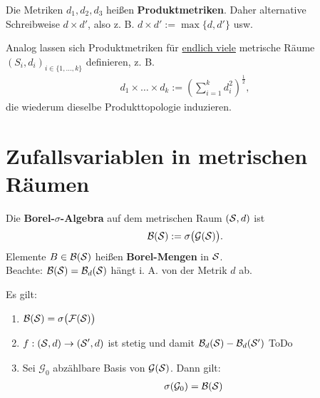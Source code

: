 \begin{defi}
Die Metriken $d_1,d_2,d_3$ heißen \textbf{Produktmetriken}. Daher alternative\\ Schreibweise $d\times d'$, also z. B. $d\times d':=\max\lbrace d,d'\rbrace$ usw.
\end{defi}

\begin{bemerkungnr} %
Analog lassen sich Produktmetriken für \underline{endlich viele} metrische Räume $(S_i,d_i)_{i\in\lbrace1,\ldots,k\rbrace}$ definieren, z. B.
\begin{align*}
d_1\times\ldots\times d_k:=\left(\sum\limits_{i=1}^k d_i^2\right)^{\frac{1}{2}},
\end{align*}
die wiederum dieselbe Produkttopologie induzieren.
\end{bemerkungnr}

\section{Zufallsvariablen in metrischen Räumen}
\begin{definition} %
Die \textbf{Borel-$\sigma$-Algebra} auf dem metrischen Raum $(\S,d)$ ist %
\begin{align*}
\B(\S):=\sigma\big(\mathcal{G}(\S)\big).
\end{align*}
Elemente $B\in\B(\S)$ heißen \textbf{Borel-Mengen} in $\S$.\\
Beachte: $\B(\S)=\B_d(\S)$ hängt i. A. von der Metrik $d$ ab.
\end{definition}

\begin{lemma}\label{Lemma3.2} %
Es gilt:
\begin{enumerate}[label=(\arabic*)]
\item 
$\begin{aligned}
\B(\S)=\sigma\big(\mathcal{F}(\S)\big)
\end{aligned}$
\item $\begin{aligned}
f:(\S,d)\to(\S',d)
\end{aligned}$ ist stetig und damit $\B_d(\S)-\B_d(\S')$ ToDo
\item Sei $\mathcal{G}_0$ abzählbare Basis von $\mathcal{G}(\S)$. Dann gilt:
\begin{align*}
\sigma(\mathcal{G}_0)=\B(\S)
\end{align*}
\end{enumerate}
\end{lemma}

